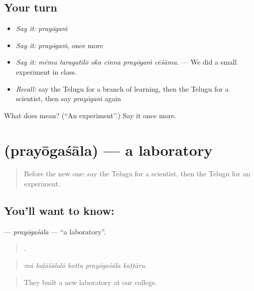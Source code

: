 \subsection*{Your turn}
\begin{itemize}
\raggedright
  \item \emph{Say it:} \emph{prayōgaṁ}
  \item \emph{Say it:} \emph{prayōgaṁ}, once more
  \item \emph{Say it:} \emph{mēmu taragatilō oka cinna prayōgaṁ cēśāmu.} — We did a small experiment in class.
  \item \emph{Recall:} say the Telugu for a branch of learning, then the Telugu for a scientist, then say \emph{prayōgaṁ} again
\end{itemize}

\begin{tcolorbox}[breakable,colback=teal!4,colframe=teal!35!black,title={Before you move on}]
What does  mean? (\textquotedblleft{}An experiment\textquotedblright{}.) Say it once more.
\end{tcolorbox}
\section[\texorpdfstring{\te{ప్రయోగశాల} (prayōgaśāla)}{ప్రయోగశాల (prayōgaśāla)}]{ (prayōgaśāla) — a laboratory}

\label{lesson:TE-C413-prayogasala}



\begin{quote}
Before the new one: say the Telugu for a scientist, then the Telugu for an experiment.
\end{quote}

\subsection*{You'll want to know: }
\textbf{} — \emph{prayōgaśāla} — \textquotedblleft{}a laboratory\textquotedblright{}.

\begin{quote}
    .
\end{quote}

\begin{quote}
\emph{mā kaḷāśālalō kotta prayōgaśāla kaṭṭāru.}
\end{quote}

\begin{quote}
They built a new laboratory at our college.
\end{quote}

